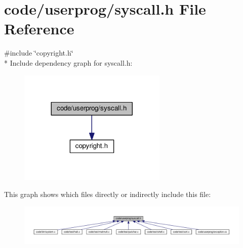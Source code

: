 \section{code/userprog/syscall.h File Reference}
\label{syscall_8h}
{\ttfamily \#include \char`\"{}copyright.\+h\char`\"{}}\\*
Include dependency graph for syscall.\+h\+:
\nopagebreak
\begin{figure}[H]
\begin{center}
\leavevmode
\includegraphics[width=200pt]{syscall_8h__incl}
\end{center}
\end{figure}
This graph shows which files directly or indirectly include this file\+:
\nopagebreak
\begin{figure}[H]
\begin{center}
\leavevmode
\includegraphics[width=350pt]{syscall_8h__dep__incl}
\end{center}
\end{figure}
